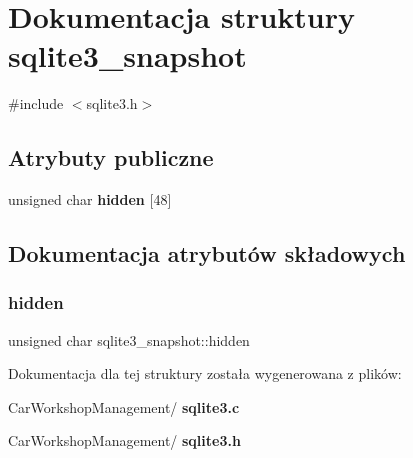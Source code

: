 \section{Dokumentacja struktury sqlite3\+\_\+snapshot}
\label{structsqlite3__snapshot}


{\ttfamily \#include $<$sqlite3.\+h$>$}

\subsection*{Atrybuty publiczne}
\begin{DoxyCompactItemize}
\item 
unsigned char \textbf{ hidden} [48]
\end{DoxyCompactItemize}


\subsection{Dokumentacja atrybutów składowych}
\mbox{\label{structsqlite3__snapshot_a1e286b808bce9c56082c1aa775127d5a}} 
\subsubsection{hidden}
{\footnotesize\ttfamily unsigned char sqlite3\+\_\+snapshot\+::hidden}



Dokumentacja dla tej struktury została wygenerowana z plików\+:\begin{DoxyCompactItemize}
\item 
Car\+Workshop\+Management/\textbf{ sqlite3.\+c}\item 
Car\+Workshop\+Management/\textbf{ sqlite3.\+h}\end{DoxyCompactItemize}
